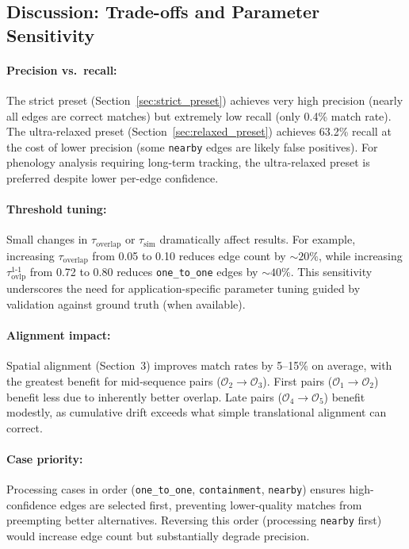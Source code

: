 \subsection{Discussion: Trade-offs and Parameter Sensitivity}

\paragraph{Precision vs.\ recall:} The strict preset (Section~\ref{sec:strict_preset}) achieves very high precision (nearly all edges are correct matches) but extremely low recall (only 0.4\% match rate). The ultra-relaxed preset (Section~\ref{sec:relaxed_preset}) achieves 63.2\% recall at the cost of lower precision (some \texttt{nearby} edges are likely false positives). For phenology analysis requiring long-term tracking, the ultra-relaxed preset is preferred despite lower per-edge confidence.

\paragraph{Threshold tuning:} Small changes in $\tau_{\text{overlap}}$ or $\tau_{\text{sim}}$ dramatically affect results. For example, increasing $\tau_{\text{overlap}}$ from 0.05 to 0.10 reduces edge count by $\sim 20\%$, while increasing $\tau_{\text{ovlp}}^{\text{1-1}}$ from 0.72 to 0.80 reduces \texttt{one\_to\_one} edges by $\sim 40\%$. This sensitivity underscores the need for application-specific parameter tuning guided by validation against ground truth (when available).

\paragraph{Alignment impact:} Spatial alignment (Section~3) improves match rates by 5--15\% on average, with the greatest benefit for mid-sequence pairs ($\mathcal{O}_2 \to \mathcal{O}_3$). First pairs ($\mathcal{O}_1 \to \mathcal{O}_2$) benefit less due to inherently better overlap. Late pairs ($\mathcal{O}_4 \to \mathcal{O}_5$) benefit modestly, as cumulative drift exceeds what simple translational alignment can correct.

\paragraph{Case priority:} Processing cases in order (\texttt{one\_to\_one}, \texttt{containment}, \texttt{nearby}) ensures high-confidence edges are selected first, preventing lower-quality matches from preempting better alternatives. Reversing this order (processing \texttt{nearby} first) would increase edge count but substantially degrade precision.

